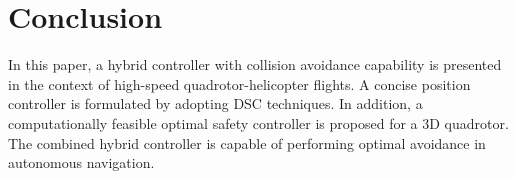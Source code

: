 \documentclass[journal,11pt,onecolumn,draftclsnofoot,]{IEEEtran}
\begin{document}

\section{\textbf{Conclusion}}

In this paper, a hybrid controller with collision avoidance capability is presented in the context of high-speed quadrotor-helicopter flights. A concise position controller is formulated by adopting DSC techniques. In addition, a computationally feasible optimal safety controller is proposed for a 3D quadrotor. The combined hybrid controller is capable of performing optimal avoidance in autonomous navigation.
\end{document}
